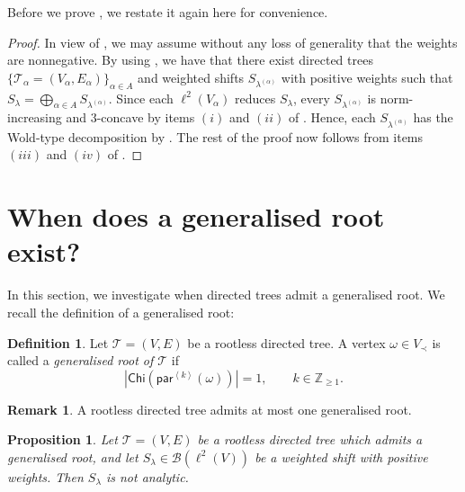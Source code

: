 \documentclass[11pt, reqno, a4paper]{amsart}
\newtheorem{proposition}[theorem]{Proposition}
\theoremstyle{definition}
\newtheorem{definition}[theorem]{Definition}
\newtheorem{remark}[theorem]{Remark}
\newcommand{\calB}{{\mathcal{B}}}
\newcommand{\scrT}{{\mathscr T}}
\newcommand{\ip}[1]{\left\langle #1 \right\rangle}
\newcommand{\abs}[1]{\left\lvert #1 \right\rvert}
\renewcommand{\ge}{\geqslant}
\newcommand{\Z}{\mathbb Z}
\newcommand{\Chi}{\mathsf{Chi}}
\newcommand{\pr}{\mathsf{par}}
\numberwithin{equation}{section}
\begin{document}
Before we prove , we restate it again here for convenience.

    \threeConcave*
    \begin{proof}
        In view of \cite[Theorem 3.2.1]{MR2919910}, we may assume without any loss of generality that the weights are nonnegative. By using , we have that there exist directed trees $\{\scrT_\alpha=( V_\alpha, E_\alpha)\}_{\alpha\in A}$ and weighted shifts $S_{\lambda^{(\alpha)}}$ with positive weights such that $S_\lambda = \bigoplus_{\alpha\in A}S_{\lambda^{(\alpha)}}$.
        Since each $\ell^2( V_\alpha)$ reduces $S_\lambda$, every $S_{\lambda^{(\alpha)}}$ is norm-increasing and $3$-concave by items $(i)$ and $(ii)$ of . Hence, each $S_{\lambda^{(\alpha)}}$ has the Wold-type decomposition by . The rest of the proof now follows from items $(iii)$ and $(iv)$ of .
    \end{proof}



\section{When does a generalised root exist?}\label{sec:generalised-root}

In this section, we investigate when directed trees admit a generalised root. We recall the definition of a generalised root:
\begin{definition}\label{def:generalised-root}
    Let $\scrT=( V, E)$ be a rootless directed tree. A vertex $\omega\in V_{\prec}$ is called a \textit{generalised root of $\scrT$} if
    \begin{equation}
        \label{eq:generalised-root-1}
        \abs{\Chi (\pr ^{\ip{k}} (\omega))} =1, \qquad k \in \Z_{\ge 1}.
    \end{equation}
\end{definition}

\begin{remark}
    A rootless directed tree admits at most one generalised root.
\end{remark}

\begin{proposition}
    \label{prop:generalised-root-not-analytic}
    Let $\scrT=(V,E)$ be a rootless directed tree which admits a generalised root, and let $S_{\lambda}\in\calB(\ell^2(V))$ be a weighted shift with positive weights. Then $S_{\lambda}$ is not analytic.
\end{proposition}
\end{document}
